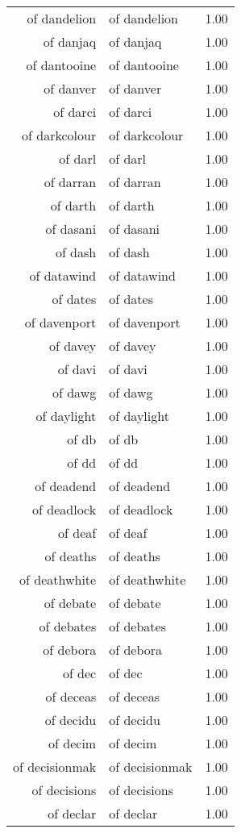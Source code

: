\begin{table}[ht]
\begin{tabular}{rlr}
  of dandelion & of dandelion & 1.00 \\ 
  of danjaq & of danjaq & 1.00 \\ 
  of dantooine & of dantooine & 1.00 \\ 
  of danver & of danver & 1.00 \\ 
  of darci & of darci & 1.00 \\ 
  of darkcolour & of darkcolour & 1.00 \\ 
  of darl & of darl & 1.00 \\ 
  of darran & of darran & 1.00 \\ 
  of darth & of darth & 1.00 \\ 
  of dasani & of dasani & 1.00 \\ 
  of dash & of dash & 1.00 \\ 
  of datawind & of datawind & 1.00 \\ 
  of dates & of dates & 1.00 \\ 
  of davenport & of davenport & 1.00 \\ 
  of davey & of davey & 1.00 \\ 
  of davi & of davi & 1.00 \\ 
  of dawg & of dawg & 1.00 \\ 
  of daylight & of daylight & 1.00 \\ 
  of db & of db & 1.00 \\ 
  of dd & of dd & 1.00 \\ 
  of deadend & of deadend & 1.00 \\ 
  of deadlock & of deadlock & 1.00 \\ 
  of deaf & of deaf & 1.00 \\ 
  of deaths & of deaths & 1.00 \\ 
  of deathwhite & of deathwhite & 1.00 \\ 
  of debate & of debate & 1.00 \\ 
  of debates & of debates & 1.00 \\ 
  of debora & of debora & 1.00 \\ 
  of dec & of dec & 1.00 \\ 
  of deceas & of deceas & 1.00 \\ 
  of decidu & of decidu & 1.00 \\ 
  of decim & of decim & 1.00 \\ 
  of decisionmak & of decisionmak & 1.00 \\ 
  of decisions & of decisions & 1.00 \\ 
  of declar & of declar & 1.00 \\ 

\end{tabular}
\end{table}
